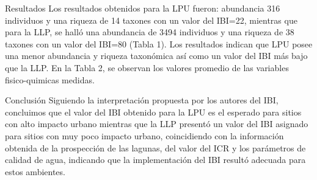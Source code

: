 \documentclass[final]{beamer}
\newlength{\onecolwid}
\begin{document}
\begin{frame}[t]
\begin{columns}[t]
\begin{column}{\onecolwid}
          
          
          \begin{block}{Resultados}
         Los resultados obtenidos para la LPU fueron: abundancia 316 individuos y una riqueza de 14 taxones con un valor del IBI=22, mientras que para la LLP, se halló una abundancia de 3494 individuos y una riqueza de 38 taxones con un valor del IBI=80 (Tabla 1). Los resultados indican que  LPU posee una menor abundancia y riqueza taxonómica así como un valor del IBI más bajo que la LLP. En la Tabla 2, se observan los valores promedio de las variables fisico-quimicas medidas. 
         
          \end{block}
          
          
          \begin{block}{Conclusión}
          Siguiendo la interpretación propuesta por los autores del IBI, concluimos que el valor del IBI obtenido para la LPU es el esperado para sitios con alto impacto urbano mientras que la LLP presentó un valor del IBI asignado para sitios con muy poco impacto urbano, coincidiendo con la información obtenida de la prospección de las lagunas, del valor del ICR y los parámetros de calidad de agua, indicando que  la implementación del IBI resultó adecuada para estos ambientes. 
          \end{block}
          
         \end{column}
                  

\end{columns}
\end{frame}
\end{document}
